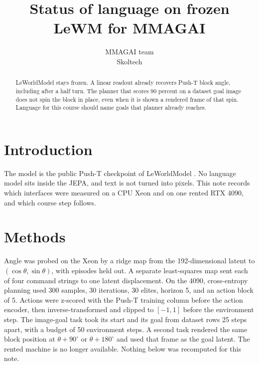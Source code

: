 \documentclass[11pt,a4paper]{article}
\title{Status of language on frozen LeWM for MMAGAI}
\author{MMAGAI team\\Skoltech}
\date{}
\begin{document}
\maketitle

\begin{abstract}
LeWorldModel stays frozen.
A linear readout already recovers Push-T block angle, including after a half turn.
The planner that scores 90 percent on a dataset goal image does not spin the block in place, even when it is shown a rendered frame of that spin.
Language for this course should name goals that planner already reaches.
\end{abstract}

\section{Introduction}
The model is the public Push-T checkpoint of LeWorldModel \citep{maes2026lewm}.
No language model sits inside the JEPA, and text is not turned into pixels.
This note records which interfaces were measured on a CPU Xeon and on one rented RTX 4090, and which course step follows.

\section{Methods}
Angle was probed on the Xeon by a ridge map from the 192-dimensional latent to $(\cos\theta,\sin\theta)$, with episodes held out.
A separate least-squares map sent each of four command strings to one latent displacement.
On the 4090, cross-entropy planning used 300 samples, 30 iterations, 30 elites, horizon 5, and an action block of 5.
Actions were z-scored with the Push-T training column before the action encoder, then inverse-transformed and clipped to $[-1,1]$ before the environment step.
The image-goal task took its start and its goal from dataset rows 25 steps apart, with a budget of 50 environment steps.
A second task rendered the same block position at $\theta+90^{\circ}$ or $\theta+180^{\circ}$ and used that frame as the goal latent.
The rented machine is no longer available.
Nothing below was recomputed for this note.
\end{document}
